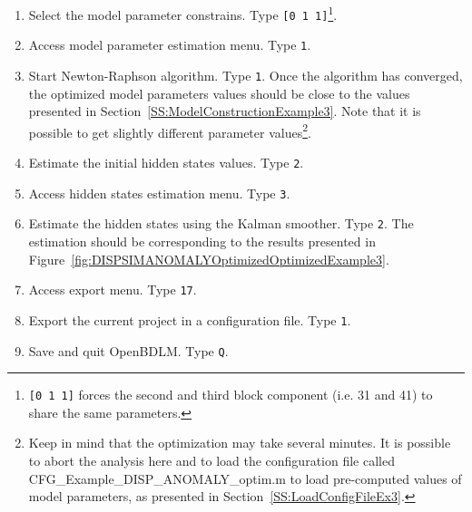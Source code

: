 \begin{enumerate}
\item Select the model parameter constrains. Type \colorbox{light-gray}{\lstinline[basicstyle = \mlttfamily \small, backgroundcolor = \color{light-gray}]![0 1 1]!}\footnote{\lstinline[basicstyle = \mlttfamily \small, backgroundcolor = \color{light-gray}]![0 1 1]! forces the second and third block component (i.e. 31 and 41) to share the same parameters.}.
\item Access model parameter estimation menu. Type \colorbox{light-gray}{\lstinline[basicstyle = \mlttfamily \small, backgroundcolor = \color{light-gray}]!1!}. 
\item Start Newton-Raphson algorithm. Type \colorbox{light-gray}{\lstinline[basicstyle = \mlttfamily \small, backgroundcolor = \color{light-gray}]!1!}. Once the algorithm has converged, the optimized model parameters values should be close to the values presented in Section~\ref{SS:ModelConstructionExample3}. Note that it is possible to get slightly different parameter values\footnote{Keep in mind that the optimization may take several minutes. It is possible to abort the analysis here and to load the configuration file called CFG\_Example\_DISP\_ANOMALY\_optim.m to load pre-computed values of model parameters, as presented in Section~\ref{SS:LoadConfigFileEx3}.}.
\item Estimate the initial hidden states values. Type \colorbox{light-gray}{\lstinline[basicstyle = \mlttfamily \small, backgroundcolor = \color{light-gray}]!2!}.
\item Access hidden states estimation menu. Type \colorbox{light-gray}{\lstinline[basicstyle = \mlttfamily \small, backgroundcolor = \color{light-gray}]!3!}. 
\item Estimate the hidden states using the Kalman smoother. Type \colorbox{light-gray}{\lstinline[basicstyle = \mlttfamily \small, backgroundcolor = \color{light-gray}]!2!}. The estimation should be corresponding to the results presented in Figure~\ref{fig:DISPSIMANOMALYOptimizedOptimizedExample3}.
\item Access export menu. Type \colorbox{light-gray}{\lstinline[basicstyle = \mlttfamily \small, backgroundcolor = \color{light-gray}]!17!}. 
\item Export the current project in a configuration file. Type \colorbox{light-gray}{\lstinline[basicstyle = \mlttfamily \small, backgroundcolor = \color{light-gray}]!1!}.
\item Save and quit OpenBDLM. Type \colorbox{light-gray}{\lstinline[basicstyle = \mlttfamily \small, backgroundcolor = \color{light-gray}]!Q!}.
\end{enumerate}

